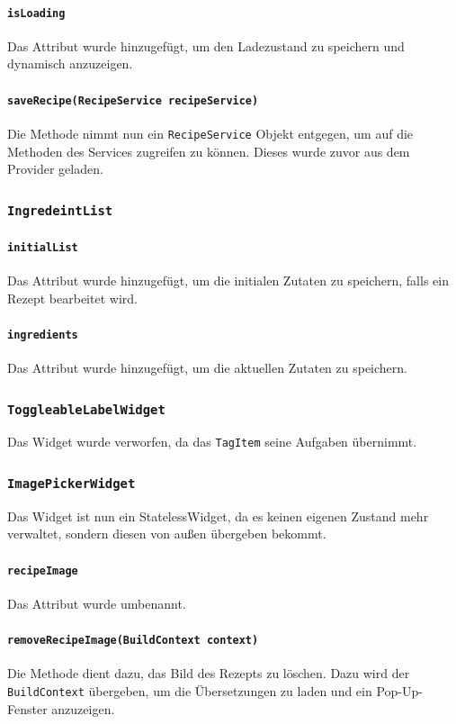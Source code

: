 \documentclass{implementierungsheft}
\begin{document}
\paragraph{\texttt{isLoading}}
Das Attribut wurde hinzugefügt, um den Ladezustand zu speichern und dynamisch anzuzeigen.
\paragraph{\texttt{saveRecipe(RecipeService recipeService)}}
Die Methode nimmt nun ein \texttt{RecipeService} Objekt entgegen, um auf die Methoden des Services zugreifen zu können. Dieses wurde zuvor aus dem Provider geladen.
\subsubsection*{\texttt{IngredeintList}}
\paragraph*{\texttt{initialList}}
Das Attribut wurde hinzugefügt, um die initialen Zutaten zu speichern, falls ein Rezept bearbeitet wird.
\paragraph*{\texttt{ingredients}}
Das Attribut wurde hinzugefügt, um die aktuellen Zutaten zu speichern.
\subsubsection*{\texttt{ToggleableLabelWidget}}
Das Widget wurde verworfen, da das \texttt{TagItem} seine Aufgaben übernimmt.
\subsubsection*{\texttt{ImagePickerWidget}}
Das Widget ist nun ein StatelessWidget, da es keinen eigenen Zustand mehr verwaltet, sondern diesen von außen übergeben bekommt.
\paragraph{\texttt{recipeImage}}
Das Attribut wurde umbenannt.
\paragraph{\texttt{removeRecipeImage(BuildContext context)}}
Die Methode dient dazu, das Bild des Rezepts zu löschen. Dazu wird der \texttt{BuildContext} übergeben, um die Übersetzungen zu laden und ein Pop-Up-Fenster anzuzeigen.
\end{document}
